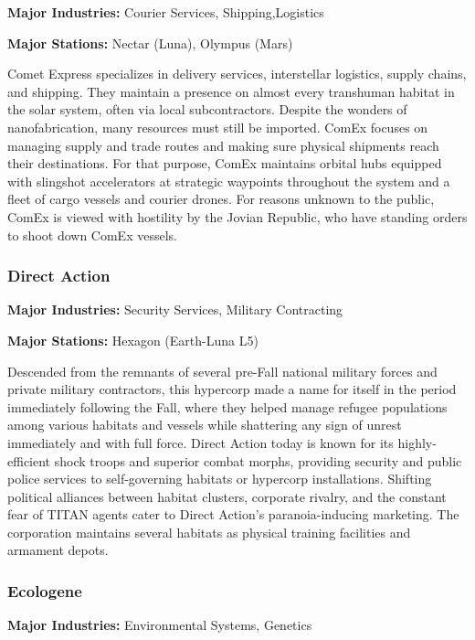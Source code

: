 \textbf{Major Industries:} Courier Services, Shipping,Logistics 

\textbf{Major Stations:} Nectar (Luna), Olympus (Mars) 

Comet Express specializes in delivery services, interstellar logistics, supply chains, and shipping. They maintain a presence on almost every transhuman habitat in the solar system, often via local subcontractors. Despite the wonders of nanofabrication, many resources must still be imported. ComEx focuses on managing supply and trade routes and making sure physical shipments reach their destinations. For that purpose, ComEx maintains orbital hubs equipped with slingshot accelerators at strategic waypoints throughout the system and a fleet of cargo vessels and courier drones. For reasons unknown to the public, ComEx is viewed with hostility by the Jovian Republic, who have standing orders to shoot down ComEx vessels. 

\subsubsection{Direct Action} \label{sec:direct-action} 

\textbf{Major Industries:} Security Services, Military Contracting 

\textbf{Major Stations:} Hexagon (Earth-Luna L5) 

Descended from the remnants of several pre-Fall national military forces and private military contractors, this hypercorp made a name for itself in the period immediately following the Fall, where they helped manage refugee populations among various habitats and vessels while shattering any sign of unrest immediately and with full force. Direct Action today is known for its highly-efficient shock troops and superior combat morphs, providing security and public police services to self-governing habitats or hypercorp installations. Shifting political alliances between habitat clusters, corporate rivalry, and the constant fear of TITAN agents cater to Direct Action's paranoia-inducing marketing. The corporation maintains several habitats as physical training facilities and armament depots. 

\subsubsection{Ecologene} \label{sec:ecologene} 

\textbf{Major Industries:} Environmental Systems, Genetics 

